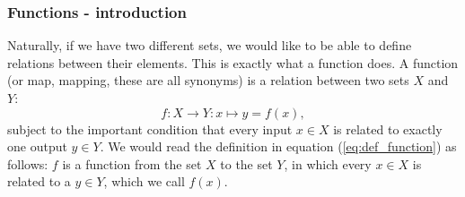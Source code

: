     \subsubsection{Functions - introduction}
        Naturally, if we have two different sets, we would like to be able to define relations between their elements. This is exactly what a function does. A function (or map, mapping, these are all synonyms) is a relation between two sets $X$ and $Y$:
        \begin{equation} \label{eq:def_function}
            f: X \rightarrow Y: x \mapsto y = f(x) ,
        \end{equation}
        subject to the important condition that every input $x \in X$ is related to exactly one output $y \in Y$. We would read the definition in equation (\ref{eq:def_function}) as follows: $f$ is a function from the set $X$ to the set $Y$, in which every $x \in X$ is related to a $y \in Y$, which we call $f(x)$. \\


